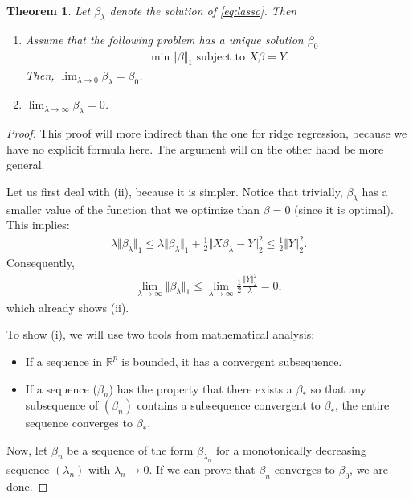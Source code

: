 \documentclass{article}
\newcommand{\R}{\mathbb{R}}
\newtheorem{theorem}{Theorem}
\newcommand{\norm}[1]{\Vert #1 \Vert}
\begin{document}
\begin{theorem}
    Let $\beta_\lambda$ denote the solution of \eqref{eq:lasso}. Then
    \begin{enumerate}
        \item Assume that the following problem has a unique solution $\beta_0$
        \begin{align}
            \min \norm{\beta}_1 \text{ subject to } X\beta = Y. \label{eq:BP}
        \end{align}
        Then, $\lim_{\lambda \to 0} \beta_\lambda = \beta_0$.
        \item $\lim_{\lambda \to \infty} \beta_\lambda = 0$.
    \end{enumerate}

\end{theorem}
\begin{proof}
    This proof will more indirect than the one for ridge regression, because we have no explicit formula here. The argument will on the other hand be more general.

    Let us first deal with (ii), because it is simpler. Notice that trivially, $\beta_\lambda$ has a smaller value of the function that we optimize than $\beta=0$ (since it is optimal). This implies:
    \begin{align*}
        \lambda \norm{\beta_\lambda}_1 \leq \lambda \norm{\beta_\lambda}_1  + \tfrac{1}{2}\norm{X\beta_\lambda - Y }_2^2 \leq \tfrac{1}{2}\norm{Y}_2^2.
    \end{align*}
    Consequently,
    \begin{align*}
        \lim_{\lambda \to \infty} \norm{\beta_\lambda}_1 \leq \lim_{\lambda \to \infty} \tfrac{1}{2}\frac{\norm{Y}_2^2}{\lambda} = 0,
    \end{align*}
    which already shows (ii).
 
    To show (i), we will use two tools from mathematical analysis:
    \begin{itemize}
        \item If a sequence in $\R^p$ is bounded, it has a convergent subsequence.
        \item If a sequence ($\beta_n$) has the property that there exists a $\beta_*$ so that any subsequence of $(\beta_n)$ contains a subsequence convergent to $\beta_*$, the entire sequence converges to $\beta_*$.
    \end{itemize}
    Now, let $\beta_n$ be a sequence of the form $\beta_{\lambda_n}$ for a monotonically decreasing sequence $(\lambda_n)$ with $\lambda_n \to 0$. If we can prove that $\beta_n$ converges to $\beta_0$, we are done.


\end{proof}
\end{document}
